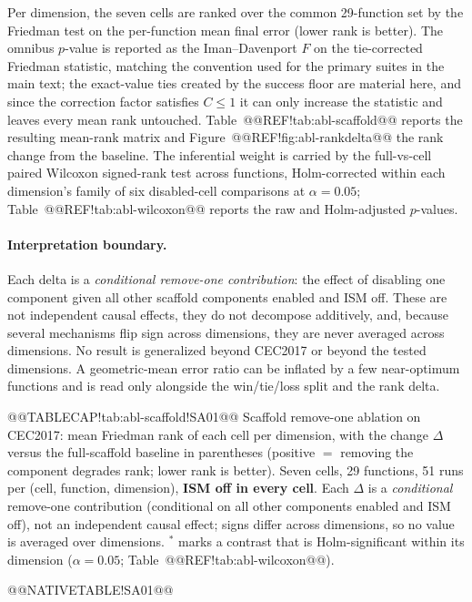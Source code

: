 \documentclass[10pt,a4paper]{article}
\begin{document}
Per dimension, the seven cells are ranked over the common 29-function set by
the Friedman test on the
per-function mean final error (lower rank is better).  The omnibus
$p$-value is reported as the Iman--Davenport $F$ on the tie-corrected
Friedman statistic, matching the convention used for the primary suites in
the main text; the exact-value ties created by the success floor are
material here, and since the correction factor satisfies $C \leq 1$ it can
only increase the statistic and leaves every mean rank untouched.
Table~@@REF!tab:abl-scaffold@@ reports the resulting mean-rank matrix and
Figure~@@REF!fig:abl-rankdelta@@ the rank change from the baseline.  The
inferential weight is carried by the full-vs-cell paired Wilcoxon signed-rank
test across functions, Holm-corrected
within each dimension's family of six disabled-cell
comparisons at $\alpha = 0.05$; Table~@@REF!tab:abl-wilcoxon@@ reports the raw
and Holm-adjusted $p$-values.

\paragraph{Interpretation boundary.}
Each delta is a \emph{conditional remove-one contribution}: the effect of
disabling one component given all other scaffold components enabled and ISM
off.  These are not independent causal effects, they do not decompose
additively, and, because several mechanisms flip sign across dimensions,
they are never averaged across dimensions.  No result is generalized beyond
CEC2017 or beyond the tested dimensions.  A geometric-mean error ratio can be
inflated by a few near-optimum functions and is read only alongside the
win/tie/loss split and the rank delta.



@@TABLECAP!tab:abl-scaffold!SA01@@ Scaffold remove-one ablation on CEC2017: mean Friedman rank of each
cell per dimension, with the change $\Delta$ versus the full-scaffold
baseline in parentheses (positive $=$ removing the component degrades
rank; lower rank is better).  Seven cells, 29 functions, 51 runs per
(cell, function, dimension), \textbf{ISM off in every cell}.  Each $\Delta$
is a \emph{conditional} remove-one contribution (conditional on all other
components enabled and ISM off), not an independent causal effect; signs
differ across dimensions, so no value is averaged over dimensions.
$^{\ast}$ marks a contrast that is Holm-significant within its dimension
($\alpha = 0.05$; Table~@@REF!tab:abl-wilcoxon@@).

@@NATIVETABLE!SA01@@
\end{document}
